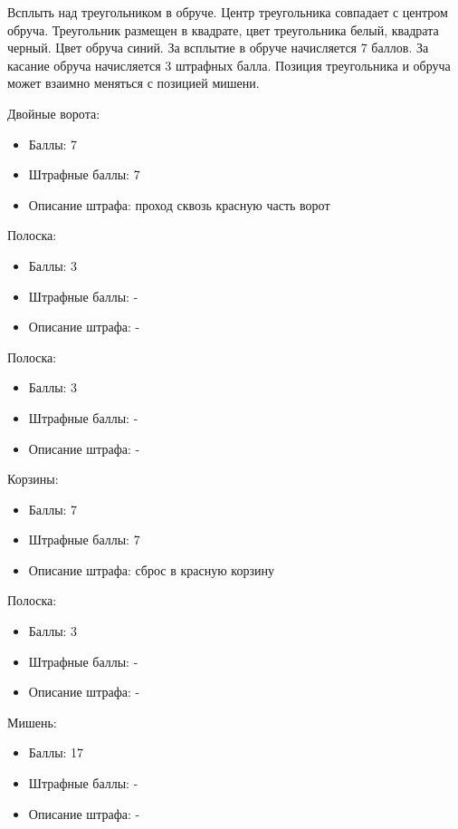 
Всплыть над треугольником в обруче. Центр треугольника совпадает с центром обруча. Треугольник размещен в квадрате, цвет треугольника белый, квадрата черный. Цвет обруча синий. За всплытие в обруче начисляется 7 баллов. За касание обруча начисляется 3 штрафных балла. Позиция  треугольника и обруча может взаимно меняться с позицией мишени.

\markSection

Двойные ворота: 
\begin{itemize}
    \item Баллы: 7
    \item Штрафные баллы: 7
    \item Описание штрафа: проход сквозь красную часть ворот
\end{itemize}

Полоска:
\begin{itemize}
    \item Баллы: 3
    \item Штрафные баллы: -
    \item Описание штрафа: -
\end{itemize}

Полоска: 
\begin{itemize}
    \item Баллы: 3
    \item Штрафные баллы: -
    \item Описание штрафа: -
\end{itemize}

Корзины:
\begin{itemize}
    \item Баллы: 7
    \item Штрафные баллы: 7
    \item Описание штрафа: сброс в красную корзину
\end{itemize}

Полоска:
\begin{itemize}
    \item Баллы: 3
    \item Штрафные баллы: -
    \item Описание штрафа: -
\end{itemize}

Мишень:
\begin{itemize}
    \item Баллы: 17
    \item Штрафные баллы: -
    \item Описание штрафа: -
\end{itemize}


